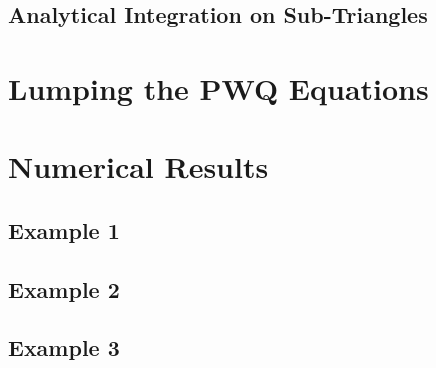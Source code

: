 \documentclass[preprint,review,10pt]{elsarticle}
\begin{document}
\subsection{Analytical Integration on Sub-Triangles} \label{sec::PWQ_Int}


\section{Lumping the PWQ Equations} \label{sec::Lumping}




\section{Numerical Results} \label{sec::results}

\subsection{Example 1} \label{sec::results_E1}

\subsection{Example 2} \label{sec::results_E2}

\subsection{Example 3} \label{sec::results_E3}
\end{document}
